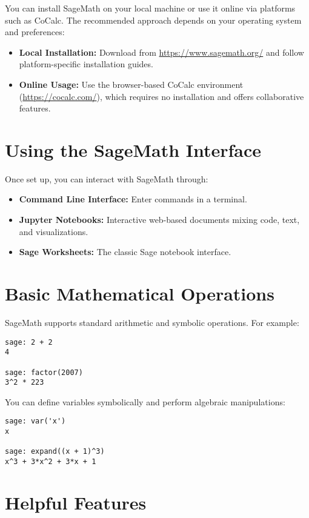 \documentclass[12pt]{book}
\begin{document}
You can install SageMath on your local machine or use it online via platforms such as CoCalc. The recommended approach depends on your operating system and preferences:

\begin{itemize}
  \item \textbf{Local Installation:} Download from \url{https://www.sagemath.org/} and follow platform-specific installation guides.
  \item \textbf{Online Usage:} Use the browser-based CoCalc environment (\url{https://cocalc.com/}), which requires no installation and offers collaborative features.
\end{itemize}

\section{Using the SageMath Interface}

Once set up, you can interact with SageMath through:

\begin{itemize}
  \item \textbf{Command Line Interface:} Enter commands in a terminal.
  \item \textbf{Jupyter Notebooks:} Interactive web-based documents mixing code, text, and visualizations.
  \item \textbf{Sage Worksheets:} The classic Sage notebook interface.
\end{itemize}

\section{Basic Mathematical Operations}

SageMath supports standard arithmetic and symbolic operations. For example:

\begin{verbatim}
sage: 2 + 2
4

sage: factor(2007)
3^2 * 223
\end{verbatim}

You can define variables symbolically and perform algebraic manipulations:

\begin{verbatim}
sage: var('x')
x

sage: expand((x + 1)^3)
x^3 + 3*x^2 + 3*x + 1
\end{verbatim}

\section{Helpful Features}
\end{document}
